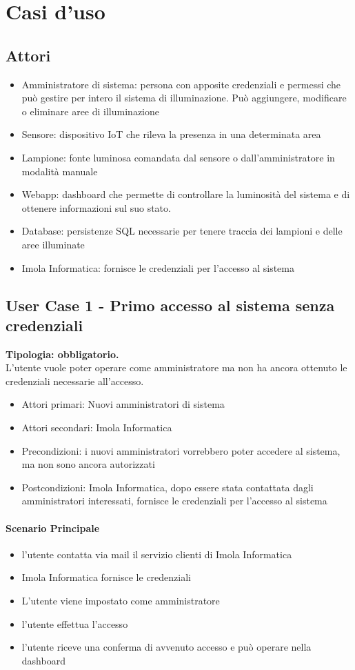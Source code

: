 \documentclass[12pt]{article}
\begin{document}
\section{Casi d'uso}
\subsection{Attori}
\begin{itemize}
	\item Amministratore di sistema: persona con apposite credenziali e permessi che può gestire per intero il sistema di illuminazione. Può aggiungere, modificare o eliminare aree di illuminazione
	\item Sensore: dispositivo IoT che rileva la presenza in una determinata area
	\item Lampione: fonte luminosa comandata dal sensore o dall'amministratore in modalità manuale
	\item Webapp: dashboard che permette di controllare la luminosità del sistema e di ottenere informazioni sul suo stato.
	\item Database: persistenze SQL necessarie per tenere traccia dei lampioni e delle aree illuminate
	\item Imola Informatica: fornisce le credenziali per l'accesso al sistema
\end{itemize}
\pagebreak

\subsection{User Case 1 - Primo accesso al sistema senza credenziali}
\textbf{Tipologia: obbligatorio.} \\
L'utente vuole poter operare come amministratore ma non ha ancora ottenuto le credenziali necessarie all'accesso.
\begin{itemize}
	\item Attori primari: Nuovi amministratori di sistema
	\item Attori secondari: Imola Informatica
	\item Precondizioni: i nuovi amministratori vorrebbero poter accedere al sistema, ma non sono ancora autorizzati
	\item Postcondizioni: Imola Informatica, dopo essere stata contattata dagli amministratori interessati, fornisce le credenziali per l'accesso al sistema
\end{itemize}
\paragraph{Scenario Principale}
\begin{itemize}
	\item l'utente contatta via mail il servizio clienti di Imola Informatica
	\item Imola Informatica fornisce le credenziali
	\item L'utente viene impostato come amministratore
	\item l'utente effettua l'accesso
	\item l'utente riceve una conferma di avvenuto accesso e può operare nella dashboard
\end{itemize}
\end{document}

